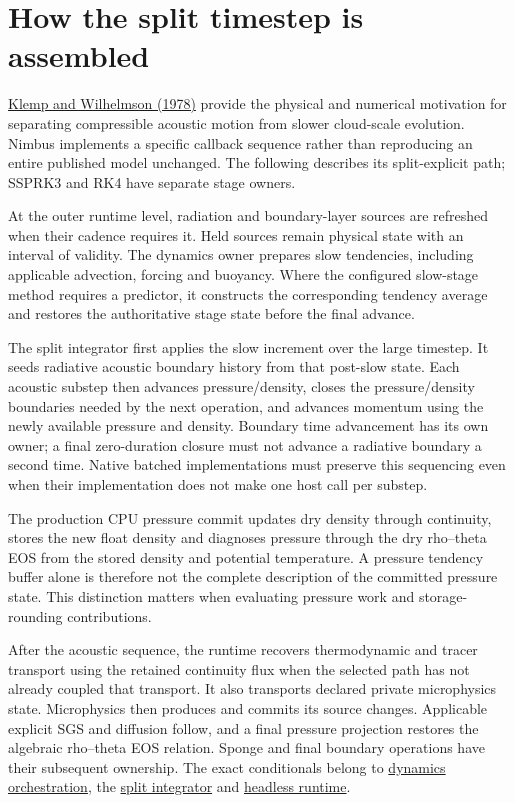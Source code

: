 \documentclass[
  11pt,
]{report}
\begin{document}
\section{How the split timestep is
assembled}\label{how-the-split-timestep-is-assembled}

\href{https://journals.ametsoc.org/abstract/journals/atsc/35/6/1520-0469_1978_035_1070_tsotdc_2_0_co_2.xml}{Klemp
and Wilhelmson (1978)} provide the physical and numerical motivation for
separating compressible acoustic motion from slower cloud-scale
evolution. Nimbus implements a specific callback sequence rather than
reproducing an entire published model unchanged. The following describes
its split-explicit path; SSPRK3 and RK4 have separate stage owners.

At the outer runtime level, radiation and boundary-layer sources are
refreshed when their cadence requires it. Held sources remain physical
state with an interval of validity. The dynamics owner prepares slow
tendencies, including applicable advection, forcing and buoyancy. Where
the configured slow-stage method requires a predictor, it constructs the
corresponding tendency average and restores the authoritative stage
state before the final advance.

The split integrator first applies the slow increment over the large
timestep. It seeds radiative acoustic boundary history from that
post-slow state. Each acoustic substep then advances pressure/density,
closes the pressure/density boundaries needed by the next operation, and
advances momentum using the newly available pressure and density.
Boundary time advancement has its own owner; a final zero-duration
closure must not advance a radiative boundary a second time. Native
batched implementations must preserve this sequencing even when their
implementation does not make one host call per substep.

The production CPU pressure commit updates dry density through
continuity, stores the new float density and diagnoses pressure through
the dry rho--theta EOS from the stored density and potential
temperature. A pressure tendency buffer alone is therefore not the
complete description of the committed pressure state. This distinction
matters when evaluating pressure work and storage-rounding
contributions.

After the acoustic sequence, the runtime recovers thermodynamic and
tracer transport using the retained continuity flux when the selected
path has not already coupled that transport. It also transports declared
private microphysics state. Microphysics then produces and commits its
source changes. Applicable explicit SGS and diffusion follow, and a
final pressure projection restores the algebraic rho--theta EOS
relation. Sponge and final boundary operations have their subsequent
ownership. The exact conditionals belong to
\href{../src/core/orchestration/dynamics/dynamics.cpp}{dynamics
orchestration}, the
\href{../src/numerics/time_stepping/schemes/split_explicit/split_explicit.cpp}{split
integrator} and \href{../src/core/runtime/headless_runtime.cpp}{headless
runtime}.
\end{document}
